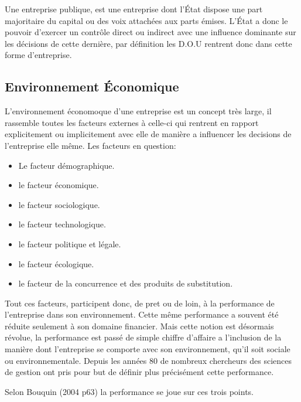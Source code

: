         Une entreprise publique, est une entreprise dont l'État dispose une part majoritaire du capital ou des voix attachées aux parts émises. L'État a donc le pouvoir d'exercer un contrôle direct ou indirect avec une influence dominante sur les décisions de cette dernière\cite{def-entreprise-pub}, par définition les \acs{D.O.U} rentrent donc dans cette forme d'entreprise.\\
        
    \subsection{Environnement Économique \cite{env-entreprise}}
        L'environnement économoque d'une entreprise est un concept très large, il rassemble toutes les facteurs externes à celle-ci qui rentrent en rapport explicitement ou implicitement avec elle de manière a influencer les decisions de l'entreprise elle même. Les facteurs en question:\\

        \begin{itemize}
            \item Le facteur démographique.
            \item le facteur économique.
            \item le facteur sociologique.
            \item le facteur technologique.
            \item le facteur politique et légale.
            \item le facteur écologique.
            \item le facteur de la concurrence et des produits de substitution.\\
        \end{itemize}

        Tout ces facteurs, participent donc, de pret ou de loin, à la performance de l'entreprise dans son environnement. Cette même performance a souvent été réduite seulement à son domaine financier. Mais cette notion est désormais révolue, la performance est passé de simple chiffre d'affaire a l'inclusion de la manière dont l'entreprise se comporte avec son environnement, qu'il soit sociale ou environnementale. Depuis les années 80 de nombreux chercheurs des sciences de gestion ont pris pour but de définir plus précisément cette performance\cite{perf-entreprise}.

        Selon Bouquin (2004 p63) la performance se joue sur ces trois points.


